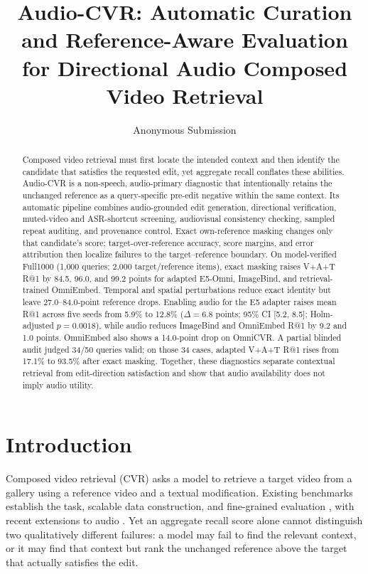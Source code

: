 \documentclass[letterpaper]{article}
\title{Audio-CVR: Automatic Curation and Reference-Aware Evaluation for Directional Audio Composed Video Retrieval}
\author{Anonymous Submission}
\begin{document}
\maketitle

\begin{abstract}
Composed video retrieval must first locate the intended context and then identify the candidate that satisfies the requested edit, yet aggregate recall conflates these abilities.
Audio-CVR is a non-speech, audio-primary diagnostic that intentionally retains the unchanged reference as a query-specific pre-edit negative within the same context.
Its automatic pipeline combines audio-grounded edit generation, directional verification, muted-video and ASR-shortcut screening, audiovisual consistency checking, sampled repeat auditing, and provenance control.
Exact own-reference masking changes only that candidate's score; target-over-reference accuracy, score margins, and error attribution then localize failures to the target--reference boundary.
On model-verified Full1000 (1,000 queries; 2,000 target/reference items), exact masking raises V+A+T R@1 by 84.5, 96.0, and 99.2 points for adapted E5-Omni, ImageBind, and retrieval-trained OmniEmbed. Temporal and spatial perturbations reduce exact identity but leave 27.0--84.0-point reference drops. Enabling audio for the E5 adapter raises mean R@1 across five seeds from 5.9\% to 12.8\% ($\Delta=6.8$ points; 95\% CI [5.2, 8.5]; Holm-adjusted $p=0.0018$), while audio reduces ImageBind and OmniEmbed R@1 by 9.2 and 1.0 points. OmniEmbed also shows a 14.0-point drop on OmniCVR. A partial blinded audit judged 34/50 queries valid; on those 34 cases, adapted V+A+T R@1 rises from 17.1\% to 93.5\% after exact masking.
Together, these diagnostics separate contextual retrieval from edit-direction satisfaction and show that audio availability does not imply audio utility.
\end{abstract}

\section{Introduction}

Composed video retrieval (CVR) asks a model to retrieve a target video from a gallery using a reference video and a textual modification.
Existing benchmarks establish the task, scalable data construction, and fine-grained evaluation \cite{ventura2024covr2,ventura2024covr,hummel2024egocvr}, with recent extensions to audio \cite{ji2026omnicvr,han2026cova}.
Yet an aggregate recall score alone cannot distinguish two qualitatively different failures: a model may fail to find the relevant context, or it may find that context but rank the unchanged reference above the target that actually satisfies the edit.
\end{document}
